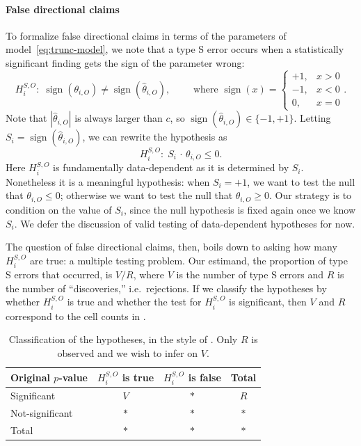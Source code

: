 \documentclass[aoas, preprint]{imsart}
\theoremstyle{definition}
\theoremstyle{custom}
\DeclareMathOperator{\sgn}{sign}
\newcommand{\htheta}{\hat{\theta}}
\begin{document}
  \paragraph{False directional claims} To formalize false directional claims in terms of the parameters of model~\eqref{eq:trunc-model}, we note that a type S error occurs when a statistically significant finding gets the sign of the parameter wrong:
  \[
    H_i^{S,O}:\; \sgn(\theta_{i,O}) \ne \sgn(\htheta_{i,O}), \qquad\text{ where } \sgn(x) =
    \begin{cases}
      +1, & x > 0 \\
      -1, & x < 0 \\
      0, & x = 0
    \end{cases}.
  \]
  Note that $|\htheta_{i,O}|$ is always larger than $c$, so $\sgn(\htheta_{i,O}) \in \{-1,+1\}$. Letting $S_i = \sgn(\htheta_{i,O})$, we can rewrite the hypothesis as
  \[
    H_i^{S,O}:\; S_i\,\cdot\, \theta_{i,O} \le 0.
  \]
  Here $H_i^{S,O}$ is fundamentally data-dependent as it is determined by $S_i$. Nonetheless it is a meaningful hypothesis: when $S_i = +1$, we want to test the null that $\theta_{i,O} \le 0$; otherwise we want to test the null that $\theta_{i,O} \ge 0$. Our strategy is to condition on the value of $S_i$, since the null hypothesis is fixed again once we know $S_i$. We defer the discussion of valid testing of data-dependent hypotheses for now.

  The question of false directional claims, then, boils down to asking how many $H_i^{S,O}$ are true: a multiple testing problem. Our estimand, the proportion of type S errors that occurred, is $V / R$, where $V$ is the number of type S errors and $R$ is the number of ``discoveries,'' i.e.\ rejections. If we classify the hypotheses by whether $H_i^{S,O}$ is true and whether the test for $H_i^{S,O}$ is significant, then $V$ and $R$ correspond to the cell counts in .
  \begin{table}[htbp]
    \centering
    \begin{tabular}{lccc}
      \toprule
      Original $p$-value & $H_i^{S,O}$ is true & $H_i^{S,O}$ is false & Total \\
      \midrule
      Significant & $V$ & $*$ & $R$ \\
      Not-significant & $*$ & $*$ & $*$ \\
      Total & $*$ & $*$ & $*$ \\
      \bottomrule
    \end{tabular}
    \caption{Classification of the hypotheses, in the style of \citet{Benjamini:1995cd}. Only $R$ is observed and we wish to infer on $V$.}
  \label{tbl:err}
  \end{table}
\end{document}
